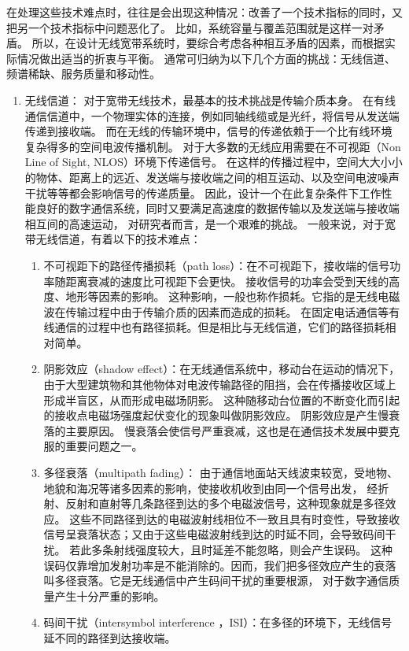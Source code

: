在处理这些技术难点时，往往是会出现这种情况：改善了一个技术指标的同时，又把另一个技术指标中问题恶化了。
比如，系统容量与覆盖范围就是这样一对矛盾。
所以，在设计无线宽带系统时，要综合考虑各种相互矛盾的因素，而根据实际情况做出适当的折衷与平衡。
通常可归纳为以下几个方面的挑战：无线信道、频谱稀缺、服务质量和移动性。
\begin{enumerate}[1)]
    \item {无线信道：}
对于宽带无线技术，最基本的技术挑战是传输介质本身。
在有线通信信道中，一个物理实体的连接，例如同轴线缆或是光纤，将信号从发送端传递到接收端。
而在无线的传输环境中，信号的传递依赖于一个比有线环境复杂得多的空间电波传播机制。
对于大多数的无线应用需要在不可视距（Non Line of Sight, NLOS）环境下传递信号。
在这样的传播过程中，空间大大小小的物体、距离上的远近、发送端与接收端之间的相互运动、以及空间电波噪声干扰等等都会影响信号的传递质量。
因此，设计一个在此复杂条件下工作性能良好的数字通信系统，同时又要满足高速度的数据传输以及发送端与接收端相互间的高速运动，
对研究者而言，是一个艰难的挑战。
一般来说，对于宽带无线信道，有着以下的技术难点：
\begin{enumerate}[(1)]
\item 不可视距下的路径传播损耗（path loss）：在不可视距下，接收端的信号功率随距离衰减的速度比可视距下会更快。
接收信号的功率会受到天线的高度、地形等因素的影响。
这种影响，一般也称作损耗。它指的是无线电磁波在传输过程中由于传输介质的因素而造成的损耗。
在固定电话通信等有线通信的过程中也有路径损耗。但是相比与无线信道，它们的路径损耗相对简单。
\item 阴影效应（shadow effect）：在无线通信系统中，移动台在运动的情况下，由于大型建筑物和其他物体对电波传输路径的阻挡，会在传播接收区域上形成半盲区，从而形成电磁场阴影。
这种随移动台位置的不断变化而引起的接收点电磁场强度起伏变化的现象叫做阴影效应。
阴影效应是产生慢衰落的主要原因。
慢衰落会使信号严重衰减，这也是在通信技术发展中要克服的重要问题之一。
\item 多径衰落（multipath fading）： 由于通信地面站天线波束较宽，受地物、地貌和海况等诸多因素的影响，使接收机收到由同一个信号出发，
    经折射、反射和直射等几条路径到达的多个电磁波信号，这种现象就是多径效应。
这些不同路径到达的电磁波射线相位不一致且具有时变性，导致接收信号呈衰落状态；又由于这些电磁波射线到达的时延不同，会导致码间干扰。
若此多条射线强度较大，且时延差不能忽略，则会产生误码。
这种误码仅靠增加发射功率是不能消除的。因而，我们把多径效应产生的衰落叫多径衰落。它是无线通信中产生码间干扰的重要根源，
对于数字通信质量产生十分严重的影响。
\item 码间干扰（intersymbol interference ，ISI）：在多径的环境下，无线信号延不同的路径到达接收端。

\end{enumerate}
\end{enumerate}
